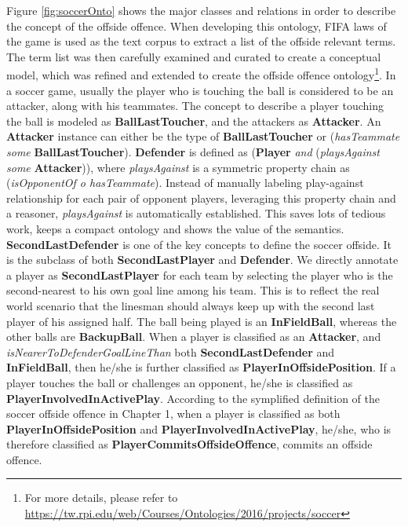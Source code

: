 Figure \ref{fig:soccerOnto} shows the major classes and relations in order to describe the concept of the offside offence.
When developing this ontology, FIFA laws of the game \cite{federation2016laws} is used as the text corpus to extract a list of the offside relevant terms.
The term list was then carefully examined and curated to create a conceptual model, which was refined and extended to create the offside offence ontology\footnote{For more details, please refer to \url{https://tw.rpi.edu/web/Courses/Ontologies/2016/projects/soccer}}.
In a soccer game, usually the player who is touching the ball is considered to be an attacker, along with his teammates.
The concept to describe a player touching the ball is modeled as \textbf{BallLastToucher}, and the attackers as \textbf{Attacker}. 
An \textbf{Attacker} instance can either be the type of \textbf{BallLastToucher} or (\textit{hasTeammate some} \textbf{BallLastToucher}).
\textbf{Defender} is defined as (\textbf{Player} \textit{and} (\textit{playsAgainst some} \textbf{Attacker})),
where \textit{playsAgainst} is a symmetric property chain as (\textit{isOpponentOf o hasTeammate}).
Instead of manually labeling play-against relationship for each pair of opponent players, leveraging this property chain and a reasoner, \textit{playsAgainst} is automatically established.
This saves lots of tedious work, keeps a compact ontology and shows the value of the semantics.
\textbf{SecondLastDefender} is one of the key concepts to define the soccer offside.
It is the subclass of both \textbf{SecondLastPlayer} and \textbf{Defender}.
We directly annotate a player as \textbf{SecondLastPlayer} for each team by selecting the player who is the second-nearest to his own goal line among his team. 
This is to reflect the real world scenario that the linesman should always keep up with the second last player of his assigned half.
The ball being played is an \textbf{InFieldBall}, whereas the other balls are \textbf{BackupBall}.
When a player is classified as an \textbf{Attacker}, and \textit{isNearerToDefenderGoalLineThan} both \textbf{SecondLastDefender} and \textbf{InFieldBall}, then he/she is further classified as \textbf{PlayerInOffsidePosition}.
If a player touches the ball or challenges an opponent, he/she is classified as \textbf{PlayerInvolvedInActivePlay}.
According to the symplified definition of the soccer offside offence in Chapter 1, when a player is classified as both \textbf{PlayerInOffsidePosition} and \textbf{PlayerInvolvedInActivePlay}, he/she, who is therefore classified as \textbf{PlayerCommitsOffsideOffence}, commits an offside offence.

